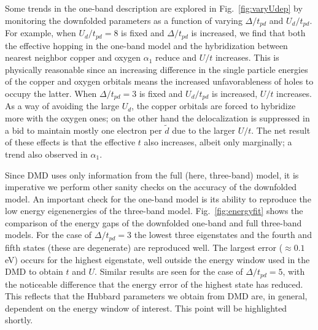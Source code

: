 Some trends in the one-band description are explored in Fig.~\ref{fig:varyUdep} 
by monitoring the downfolded parameters as a function of varying $\Delta/t_{pd}$ and $U_d/t_{pd}$. 
For example, when $U_d/t_{pd}=8$ is fixed and $\Delta/t_{pd}$ is increased, we find that both 
the effective hopping in the one-band model and the hybridization between nearest neighbor copper and oxygen $\alpha_1$ 
reduce and $U/t$ increases. This is physically reasonable since an increasing difference in the 
single particle energies of the copper and oxygen orbitals means the increased unfavorableness of holes 
to occupy the latter. When $\Delta/t_{pd}=3$ is fixed and $U_d/t_{pd}$ is increased, $U/t$ increases. 
As a way of avoiding the large $U_d$, the copper orbitals are forced to hybridize more with the oxygen ones; 
on the other hand the delocalization is suppressed in a bid to maintain mostly 
one electron per $\tilde{d}$ due to the larger $U/t$. 
The net result of these effects is that the effective $t$ also increases, albeit only marginally; a trend also observed in $\alpha_1$.

Since DMD uses only information from the full (here, three-band) model, it is imperative we 
perform other sanity checks on the accuracy of the downfolded model. An important check for the one-band model is its 
ability to reproduce the low energy eigenenergies of the three-band model. Fig.~\ref{fig:energyfit} shows 
the comparison of the energy gaps of the downfolded one-band and full three-band models. 
For the case of $\Delta/t_{pd}=3$ the lowest three eigenstates and the fourth and fifth states (these are degenerate) 
are reproduced well. The largest error ($\approx 0.1 $ eV) occurs for the highest eigenstate, 
well outside the energy window used in the DMD to obtain $t$ and $U$. 
Similar results are seen for the case of $\Delta/t_{pd}=5$, with the noticeable difference that the energy error of the highest state 
has reduced. This reflects that the Hubbard parameters we obtain from DMD are, in general, dependent on the energy window of interest. 
This point will be highlighted shortly. 

